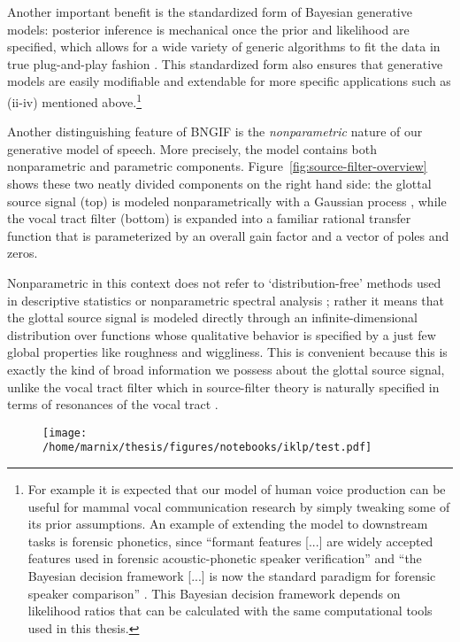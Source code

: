 \begin{chaptersections}
Another important benefit is the standardized form of Bayesian generative models:
posterior inference is mechanical once the prior and likelihood are specified, which allows for a wide variety of generic algorithms to fit the data in true plug-and-play fashion \citep{Murphy2022}.
This standardized form also ensures that generative models are easily modifiable and extendable for more specific applications such as (ii-iv) mentioned above.\footnote{%
For example it is expected that our model of human voice production can be useful for mammal vocal communication research \citep{Taylor2010} by simply tweaking some of its prior assumptions.
An example of extending the model to downstream tasks is forensic phonetics, since ``formant features [...] are widely accepted features used in forensic acoustic-phonetic speaker verification'' \citep[][p.~1]{Becker2008} and ``the Bayesian decision framework [...] is now the standard paradigm for forensic speaker comparison'' \citep[][p.~1]{Bonastre2015}.
This Bayesian decision framework depends on likelihood ratios \citep{Harrison2013} that can be calculated with the same computational tools used in this thesis.
}

Another distinguishing feature of BNGIF is the \emph{nonparametric} nature of our generative model of speech.
More precisely, the model contains both nonparametric and parametric components.
Figure~\ref{fig:source-filter-overview} shows these two neatly divided components on the right hand side:
the glottal source signal (top) is modeled nonparametrically with a Gaussian process \citep[GP;][]{Rasmussen2006}, while the vocal tract filter (bottom) is expanded into a familiar rational transfer function that is parameterized by an overall gain factor and a vector of poles and zeros.

Nonparametric in this context does not refer to `distribution-free' methods used in descriptive statistics or nonparametric spectral analysis \citep{Stoica2005};
rather it means that the glottal source signal is modeled directly through an infinite-dimensional distribution over functions whose qualitative behavior is specified by a just few global properties like roughness and wiggliness.
This is convenient because this is exactly the kind of broad information we possess about the glottal source signal, unlike the vocal tract filter which in source-filter theory is naturally specified in terms of resonances of the vocal tract \citep{Stevens2000}.

\begin{figure}
\centering
\texttt{[image: /home/marnix/thesis/figures/notebooks/iklp/test.pdf]}
\end{figure}


\end{chaptersections}
